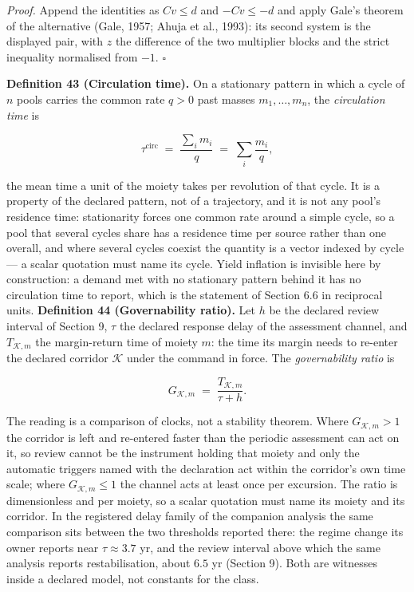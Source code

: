 \documentclass[11pt]{article}
\begin{document}
\emph{Proof.} Append the identities as \(C v \le d\) and \(-C v \le -d\) and apply Gale's theorem of the alternative (Gale, 1957; Ahuja et al., 1993): its second system is the displayed pair, with \(z\) the difference of the two multiplier blocks and the strict inequality normalised from \(-1\). \(\square\)

\textbf{Definition 43 (Circulation time).} On a stationary pattern in which a cycle of \(n\) pools carries the common rate \(q > 0\) past masses \(m_1, \dots, m_n\), the \emph{circulation time} is 

$$\tau^{\mathrm{circ}} \;=\; \frac{\sum_i m_i}{q} \;=\; \sum_i \frac{m_i}{q} ,$$

 the mean time a unit of the moiety takes per revolution of that cycle. It is a property of the declared pattern, not of a trajectory, and it is not any pool's residence time: stationarity forces one common rate around a simple cycle, so a pool that several cycles share has a residence time per source rather than one overall, and where several cycles coexist the quantity is a vector indexed by cycle --- a scalar quotation must name its cycle. Yield inflation is invisible here by construction: a demand met with no stationary pattern behind it has no circulation time to report, which is the statement of Section 6.6 in reciprocal units. \textbf{Definition 44 (Governability ratio).} Let \(h\) be the declared review interval of Section 9, \(\tau\) the declared response delay of the assessment channel, and \(T_{\mathcal{K},m}\) the margin-return time of moiety \(m\): the time its margin needs to re-enter the declared corridor \(\mathcal K\) under the command in force. The \emph{governability ratio} is 

$$G_{\mathcal{K},m} \;=\; \frac{T_{\mathcal{K},m}}{\tau + h} .$$

 The reading is a comparison of clocks, not a stability theorem. Where \(G_{\mathcal{K},m} > 1\) the corridor is left and re-entered faster than the periodic assessment can act on it, so review cannot be the instrument holding that moiety and only the automatic triggers named with the declaration act within the corridor's own time scale; where \(G_{\mathcal{K},m} \le 1\) the channel acts at least once per excursion. The ratio is dimensionless and per moiety, so a scalar quotation must name its moiety and its corridor. In the registered delay family of the companion analysis the same comparison sits between the two thresholds reported there: the regime change its owner reports near \(\tau \approx 3.7\) yr, and the review interval above which the same analysis reports restabilisation, about \(6.5\) yr (Section 9). Both are witnesses inside a declared model, not constants for the class.
\end{document}
